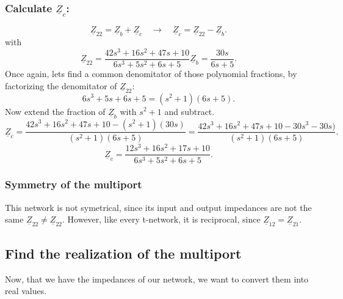 \documentclass[a4paper]{article}
\begin{document}
\subsubsection*{Calculate $\underline{Z}_{c}$:}
\[
  \underline{Z}_{22} = \underline{Z}_{b} + \underline{Z}_{c} \quad \rightarrow \quad 
  \underline{Z}_{c} = \underline{Z}_{22}-\underline{Z}_{b}
.\] 
with
\[
  \underline{Z}_{22} = \frac{42s^3+16s^2+47s+10}{6s^3+5s^2+6s+5}
  \underline{Z}_{b} = \frac{30s}{6s+5} 
.\] 
Once again, lets find a common denomitator of those polynomial fractions, by factorizing the
denomitator of $\underline{Z}_{22}$:
\[
  6s^3 + 5s + 6s + 5 = (s^2 + 1)(6s + 5)
.\] 
Now extend the fraction of $\underline{Z}_{b}$ with $s^2 + 1$ and subtract.
\[
  \underline{Z}_{c} = \frac{42s^3+16s^2+47s+10-(s^2+1)(30s)}{(s^2+1)(6s+5)} =
  \frac{42s^3+16s^2+47s+10- 30s^3 - 30s)}{(s^2+1)(6s+5)}
.\] 
\[
  \underline{Z}_{c} = \frac{12s^3 + 16s^2 + 17s +10}{6s^3 + 5s^2 + 6s+ 5}
.\] 

\clearpage
\subsubsection*{Symmetry of the multiport}
This network is not symetrical, since its input and output impedances are not the same $
\underline{Z}_{22} \ne \underline{Z}_{22}$. However, like every t-network, it is reciprocal, since $\underline{Z}_{12} =
\underline{Z}_{21}$.
\subsection{Find the realization of the multiport}
Now, that we have the impedances of our network, we want to convert them into real values.
\end{document}
